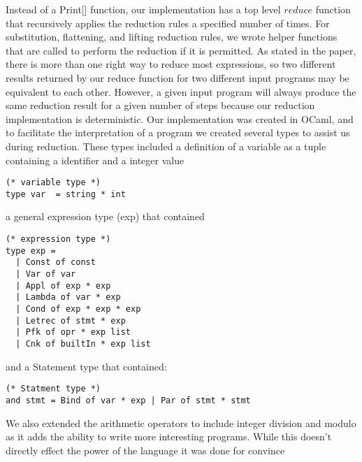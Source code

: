 \documentclass[preprint, 10pt]{sigplanconf}
\begin{document}
Instead of a Print[] function, our implementation has a top level $reduce$ function that recursively applies the reduction rules a specified number of times.  For substitution, flattening, and lifting reduction rules, we wrote helper functions that are called to perform the reduction if it is permitted.  As stated in the paper, there is more than one right way to reduce most expressions, so two different results returned by our reduce function for two different input programs may be equivalent to each other.  However, a given input program will always produce the same reduction result for a given number of steps because our reduction implementation is deterministic.  Our implementation was created in OCaml, and to facilitate the interpretation of a program we created several types to assist us during reduction. These types included a definition of a variable as a tuple containing a identifier and a integer value

\begin{verbatim}
(* variable type *)
type var  = string * int
\end{verbatim}

a general expression type (exp) that contained

\begin{verbatim}
(* expression type *)
type exp =
  | Const of const
  | Var of var
  | Appl of exp * exp
  | Lambda of var * exp
  | Cond of exp * exp * exp
  | Letrec of stmt * exp
  | Pfk of opr * exp list
  | Cnk of builtIn * exp list 
\end{verbatim}

and a Statement type that contained: 

\begin{verbatim}
(* Statment type *)
and stmt = Bind of var * exp | Par of stmt * stmt
\end{verbatim}

We also extended the arithmetic operators to include integer division and modulo as it adds the ability to write more interesting programs. While this doesn’t directly effect the power of the language it was done for convince 
\end{document}
